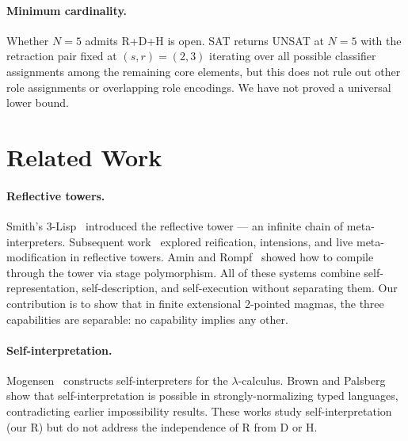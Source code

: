 \documentclass[a4paper,UKenglish,cleveref,autoref,thm-restate]{lipics-v2021}
\begin{document}
\paragraph{Minimum cardinality.}
Whether $N\!=\!5$ admits R+D+H is open. SAT returns UNSAT at $N\!=\!5$ with the retraction pair fixed at $(s, r) = (2, 3)$ iterating over all possible classifier assignments among the remaining core elements, but this does not rule out other role assignments or overlapping role encodings. We have not proved a universal lower bound.

\section{Related Work}
\label{sec:related}

\paragraph{Reflective towers.}
Smith's 3-Lisp~\cite{smith84} introduced the reflective tower --- an infinite chain of meta-interpreters. Subsequent work~\cite{friedman84,danvy88} explored reification, intensions, and live meta-modification in reflective towers. Amin and Rompf~\cite{amin18} showed how to compile through the tower via stage polymorphism. All of these systems combine self-representation, self-description, and self-execution without separating them. Our contribution is to show that in finite extensional 2-pointed magmas, the three capabilities are separable: no capability implies any other.

\paragraph{Self-interpretation.}
Mogensen~\cite{mogensen92} constructs self-interpreters for the $\lambda$-calculus. Brown and Palsberg~\cite{brown16} show that self-interpretation is possible in strongly-normalizing typed languages, contradicting earlier impossibility results. These works study self-interpretation (our R) but do not address the independence of R from D or H.
\end{document}
